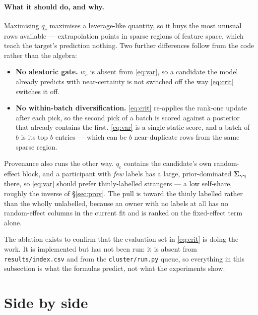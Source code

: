 \documentclass[11pt]{article}
\newcommand{\bu}{\bm{\gamma}}
\newcommand{\bS}{\bm{\Sigma}}
\begin{document}
\paragraph{What it should do, and why.} Maximising $q_c$ maximises a leverage-like quantity, so
it buys the most unusual rows available --- extrapolation points in sparse regions of feature
space, which teach the target's prediction nothing. Two further differences follow from the code
rather than the algebra:
\begin{itemize}
  \item \textbf{No aleatoric gate.} $w_c$ is absent from \eqref{eq:var}, so a candidate the model
        already predicts with near-certainty is not switched off the way \eqref{eq:crit}
        switches it off.
  \item \textbf{No within-batch diversification.} \eqref{eq:crit} re-applies the rank-one update
        after each pick, so the second pick of a batch is scored against a posterior that
        already contains the first. \eqref{eq:var} is a single static score, and a batch of $b$
        is its top $b$ entries --- which can be $b$ near-duplicate rows from the same sparse
        region.
\end{itemize}
Provenance also runs the other way. $q_c$ contains the candidate's own random-effect block, and a
participant with \emph{few} labels has a large, prior-dominated $\bS_{\bu\bu}$ there, so
\eqref{eq:var} should prefer thinly-labelled strangers --- a low self-share, roughly the inverse
of \S\ref{sec:prov}. The pull is toward the thinly labelled rather than the wholly unlabelled,
because an owner with no labels at all has no random-effect columns in the current fit and is
ranked on the fixed-effect term alone.

The ablation exists to confirm that the evaluation set in \eqref{eq:crit} is doing the work. It
is implemented but has not been run: it is absent from \texttt{results/index.csv} and from the
\texttt{cluster/run.py} queue, so everything in this subsection is what the formulas predict,
not what the experiments show.

\section{Side by side}
\label{sec:cmp}
\end{document}
